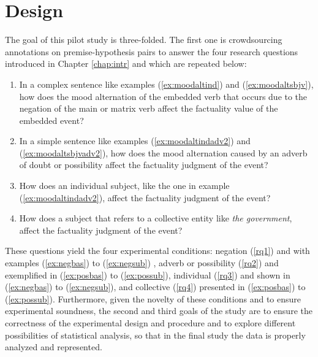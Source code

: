 \label{chap:pil}
\section{Design}
\label{sect:expdes}
The goal of this pilot study is three-folded. The first one is crowdsourcing annotations on premise-hypothesis pairs to answer the four research questions introduced in Chapter \ref{chap:intr} and which are repeated below:\\

\begin{enumerate}[RQ1.-]
        \item In a complex sentence like examples (\ref{ex:moodaltind}) and (\ref{ex:moodaltsbjv}), how does the mood alternation of the embedded verb that occurs due to the negation of the main or matrix verb affect the factuality value of the embedded event?\label{rq1}
        \item In a simple sentence like examples (\ref{ex:moodaltindadv2}) and (\ref{ex:moodaltsbjvadv2}), how does the mood alternation caused by an adverb of doubt or possibility affect the factuality judgment of the event?\label{rq2}
        \item How does an individual subject, like the one in example (\ref{ex:moodaltindadv2}), affect the factuality judgment of the event?\label{rq3}%
        \item How does a subject that refers to a collective entity like \textit{the government}, affect the factuality judgment of the event?\label{rq4}%
\end{enumerate} 

These questions yield the four experimental conditions: negation (\ref{rq1}) and with examples (\ref{ex:negbas}) to (\ref{ex:negsub}) , adverb or possibility (\ref{rq2}) and exemplified in (\ref{ex:posbas}) to (\ref{ex:possub}), individual (\ref{rq3}) and shown in (\ref{ex:negbas}) to (\ref{ex:negsub}), and collective (\ref{rq4}) presented in (\ref{ex:posbas}) to (\ref{ex:possub}). Furthermore, given the novelty of these conditions and to ensure experimental soundness, the second and third goals of the study are to ensure the correctness of the experimental design and procedure and to explore different possibilities of statistical analysis, so that in the final study the data is properly analyzed and represented.\\

